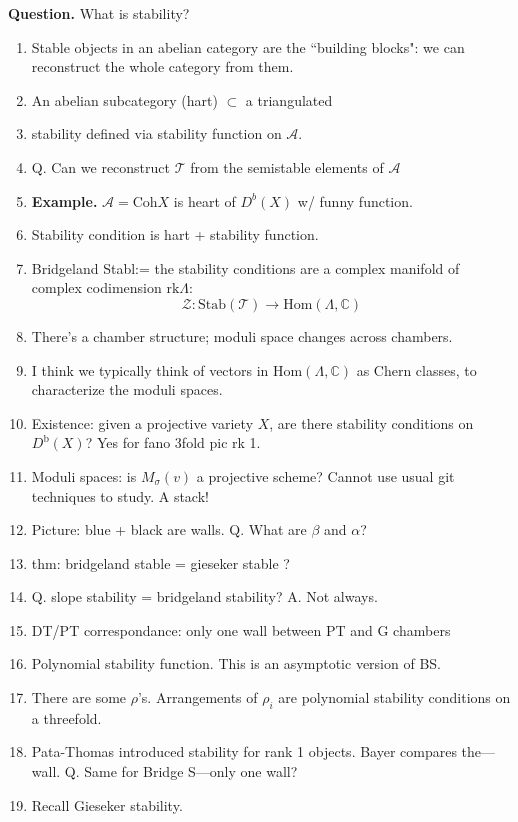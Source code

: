 {\bf Question.} What is stability?

\begin{enumerate}
\item Stable objects in an abelian category are the ``building blocks":
we can reconstruct the whole category from them.
\item  An abelian subcategory (hart) $\subset$ a triangulated
\item stability defined via stability function on $\mathcal{A}$.
\item Q. Can we reconstruct $\mathcal{T}$ from the semistable elements of
$\mathcal{A}$
\item {\bf Example.} $\mathcal{A}=\text{Coh}X$ is heart of $D^b(X)$
w/ funny function.
\item Stability condition is hart + stability function.
\item Bridgeland Stabl:= the stability conditions are a complex manifold
of complex codimension $\text{rk}\Lambda$:
$$
 \mathcal{Z}:\text{Stab}(\mathcal{T})
\longrightarrow \text{Hom}(\Lambda,\mathbb{C})
$$
\item There's a chamber structure; moduli space changes across chambers.
\item I think we typically think of vectors in $\text{Hom}(\Lambda,\mathbb{C})$ 
as Chern classes, to characterize the moduli spaces.
\item Existence: given a projective variety $X$, are there stability
conditions on $D^\text{b}(X)$? Yes for fano 3fold pic rk 1.
\item Moduli spaces: is $M_\sigma(v)$ a projective scheme? Cannot use
usual git techniques to study. A stack!
\item Picture: blue + black are walls. Q. What are $\beta$ and $\alpha$?
\item thm: bridgeland stable = gieseker stable ?
\item Q. slope stability = bridgeland stability? A. Not always.
\item DT/PT correspondance: only one wall between PT and G chambers
\medskip
\item Polynomial stability function. This is an asymptotic version of BS.
\item There are some $\rho$'s. Arrangements of $\rho_i$ are polynomial 
stability conditions on a threefold.
\item Pata-Thomas introduced stability for rank 1 objects.
Bayer compares the---wall. Q. Same for Bridge S---only one wall?
\item Recall Gieseker stability.

\end{enumerate}
